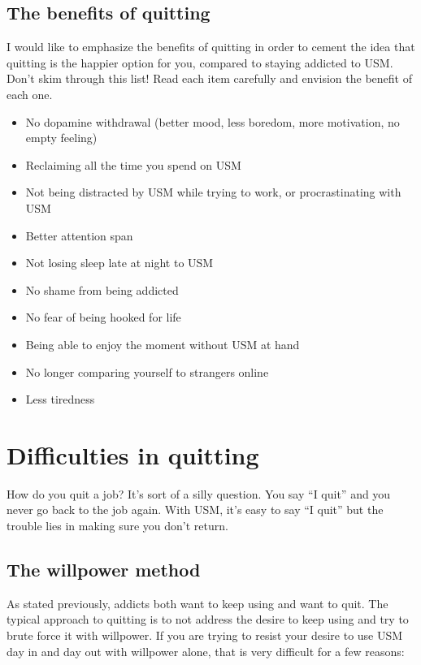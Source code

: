 \documentclass[
  openany]{book}
\providecommand{\tightlist}{%
  \setlength{\itemsep}{0pt}\setlength{\parskip}{0pt}}
\begin{document}
\section{The benefits of quitting}\label{the-benefits-of-quitting}

I would like to emphasize the benefits of quitting in order to cement the idea that quitting is the happier option for you, compared to staying addicted to USM. Don't skim through this list! Read each item carefully and envision the benefit of each one.

\begin{itemize}
\tightlist
\item
  No dopamine withdrawal (better mood, less boredom, more motivation, no empty feeling)
\item
  Reclaiming all the time you spend on USM
\item
  Not being distracted by USM while trying to work, or procrastinating with USM
\item
  Better attention span
\item
  Not losing sleep late at night to USM
\item
  No shame from being addicted
\item
  No fear of being hooked for life
\item
  Being able to enjoy the moment without USM at hand
\item
  No longer comparing yourself to strangers online
\item
  Less tiredness
\end{itemize}

\chapter{Difficulties in quitting}\label{difficulties-in-quitting}

How do you quit a job? It's sort of a silly question. You say ``I quit'' and you never go back to the job again. With USM, it's easy to say ``I quit'' but the trouble lies in making sure you don't return.

\section{The willpower method}\label{the-willpower-method}

As stated previously, addicts both want to keep using and want to quit. The typical approach to quitting is to not address the desire to keep using and try to brute force it with willpower. If you are trying to resist your desire to use USM day in and day out with willpower alone, that is very difficult for a few reasons:
\end{document}
